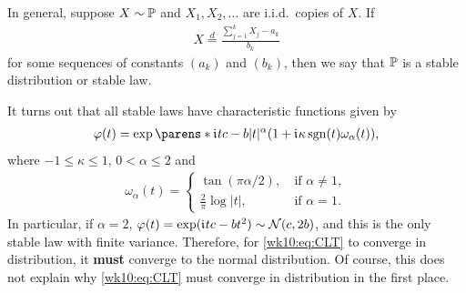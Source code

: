 \documentclass[12pt]{article}
\begin{document}
In general, suppose $X \sim \P$ and $X_1,X_2,\ldots$ are i.i.d.\ copies of $X$. If 
\begin{align*}
X\overset{d}{=} \frac{\sum_{j=1}^k X_j-a_k}{b_k}
\end{align*} 
for some sequences of constants $(a_k)$ and $(b_k)$, then we say that $\P$ is a stable distribution or stable law.

It turns out that all stable laws have characteristic functions given by
\begin{align*}
\varphi(t)= \exp\parens*{\iu tc-b|t|^{\alpha}(1+\iu\kappa\sgn(t)\omega_{\alpha}(t))},
\end{align*}
where $-1\leq\kappa\leq 1$, $0<\alpha\leq2$ and 
\begin{align*}
\omega_{\alpha}(t)=
\begin{cases}
\tan(\pi \alpha/2), &\ \text{if $\alpha \neq 1$},\\
\frac{2}{\pi}\log |t|, &\ \text{if $\alpha =1$}.
\end{cases}
\end{align*}
In particular, if $\alpha = 2$, $\varphi(t)=\exp(\mathfrak{i}\mkern1mu tc-bt^2) \sim \mathcal{N}(c,2b)$, and this is the only stable law with finite variance. Therefore, for \cref{wk10:eq:CLT} to converge in distribution, it \textbf{must} converge to the normal distribution. Of course, this does not explain why \cref{wk10:eq:CLT} must converge in distribution in the first place.

%
%

\end{document}
